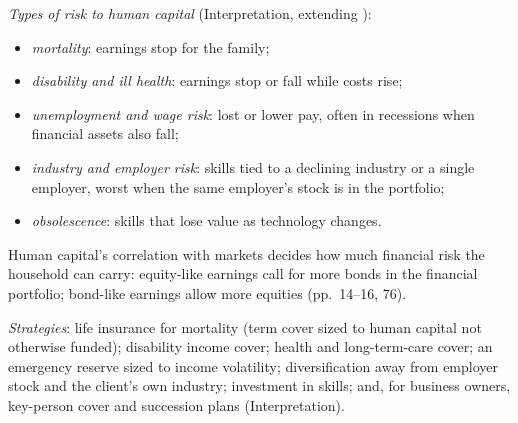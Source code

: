 \begin{qfmethod}\label{meth:human-capital-risks}
 \emph{Types of risk to human capital} (Interpretation, extending \citep[pp.~13--16, 28--31, 75--76]{ibbotson-lifetime-financial-advice-2007}):
\begin{itemize}
\item \emph{mortality}: earnings stop for the family;
\item \emph{disability and ill health}: earnings stop or fall while costs rise;
\item \emph{unemployment and wage risk}: lost or lower pay, often in recessions when financial assets also fall;
\item \emph{industry and employer risk}: skills tied to a declining industry or a single employer, worst when the same employer's stock is in the portfolio;
\item \emph{obsolescence}: skills that lose value as technology changes.
\end{itemize}
Human capital's correlation with markets decides how much financial risk the household can carry: equity-like earnings call for more bonds in the financial portfolio; bond-like earnings allow more equities (pp.~14--16, 76).

\emph{Strategies}: life insurance for mortality (term cover sized to human capital not otherwise funded); disability income cover; health and long-term-care cover; an emergency reserve sized to income volatility; diversification away from employer stock and the client's own industry; investment in skills; and, for business owners, key-person cover and succession plans (Interpretation).


\end{qfmethod}
